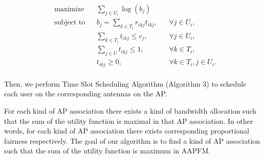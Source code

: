 	
	\begin{equation} \label{eq:cvxp}
		\begin{aligned}
			& \text{maximize} 
			& & \sum_{j \in U_i} \log (b_{j}) \\
			& \text{subject to} 
			& & b_{j} = \sum_{k \in T_{i}} r_{ikj} t_{ikj}, & & \forall j \in U_i, \\
			& & & \sum_{k \in T_i } t_{ikj} \le c_j, & & \forall j \in U_i, \\
			& & & \sum_{j\in U} t_{ikj} \le 1, & & \forall k \in T_i,  \\
			& & & t_{ikj} \ge 0, & & \forall k \in T_i, j \in U_i. \\
		\end{aligned}
	\end{equation}
	
	 Then, we perform Time Slot Scheduling Algorithm (Algorithm 3) to schedule each user on the corresponding antennas on the AP.
	 

	
	For each kind of AP  association there exists a kind of bandwidth allocation such that the sum of the utility function is maximal in that AP association. In other words, for each kind of AP association there exists corresponding proportional fairness respectively. The goal of our algorithm is to find a kind of AP association such that the sum of the utility function is maximum in AAPFM. 
	
